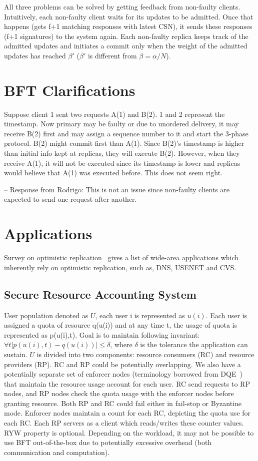 \documentclass[twocolumn,10pt]{article}
\begin{document}
{All three problems can be solved by getting feedback from non-faulty clients. 
Intuitively, each non-faulty client waits for its updates to be admitted. Once
that happens (gets f+1 matching responses with latest CSN), it sends these
responses (f+1 signatures) to the system again. Each non-faulty replica keeps
track of the admitted updates and initiates a commit only when the weight of 
the admitted updates has reached $\beta'$ ($\beta'$ is different from $\beta=\alpha/N$).

\fi

\section{BFT Clarifications}
Suppose client 1 sent two requests A(1) and B(2). 1 and 2 represent the
timestamp. Now primary may be faulty or due to unordered delivery, it may
receive B(2) first and may assign a sequence number to it and start the 
3-phase protocol. B(2) might commit first than A(1). Since B(2)'s 
timestamp is higher than initial info kept at replicas, they will 
execute B(2). However, when they receive A(1), it will not be executed
since its timestamp is lower and replicas would believe that A(1) was 
executed before. This does not seem right.

-- Response from Rodrigo: This is not an issue since non-faulty clients are
expected to send one request after another.



\section{Applications}

Survey on optimistic replication~\cite{optimistic-repl-survey} gives
a list of wide-area applications which inherently rely on optimistic
replication, such as, DNS, USENET and CVS.

\subsection{Secure Resource Accounting System}
User population denoted as $U$, each user i is represented as $u(i)$. Each
user is assigned a quota of resource q(u(i)) and at any time t, the usage
of quota is represented as p(u(i),t). Goal is to maintain following invariant:
$\forall t |p(u(i),t)-q(u(i))| \le \delta$, where $\delta$ is the tolerance
the application can sustain. $U$ is divided into two components: resource 
consumers (RC) and resource providers (RP). RC and RP could be potentially
overlapping. We also have a potentially separate set of 
enforcer nodes (terminology borrowed from DQE~\cite{Walfish2006}) that maintain the
resource usage account for each user. RC send requests to RP nodes, and 
RP nodes check the quota usage with the enforcer nodes before granting
resource. Both RP and RC could fail either in fail-stop or Byzantine mode.
Enforcer nodes maintain a count for each RC, depicting the quota use for
each RC. Each RP servers as a client which reads/writes these counter values.
RYW property is optional. Depending on the workload, it may not be possible
to use BFT out-of-the-box due to potentially excessive overhead (both 
communication and computation). 

}
\end{document}
